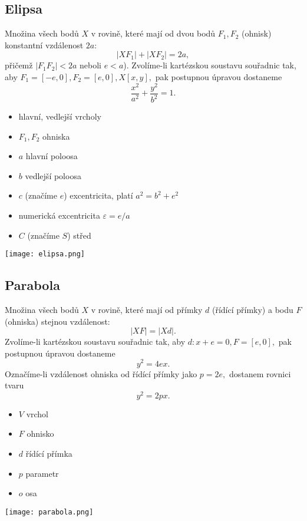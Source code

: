 \subsection{Elipsa}
Množina všech bodů $X$ v rovině, které mají od dvou bodů $F_1, F_2$
(ohnisk) konstantní vzdálenost $2a$:
$$|XF_1| + |XF_2|=2a,$$
přičemž $|F_1F_2|<2a$ neboli $e<a$).
Zvolíme-li kartézskou soustavu souřadnic tak, aby $F_1 = [-e,0], F_2=[e,0],
X[x,y],$ pak postupnou úpravou dostaneme
$$\frac{x^2}{a^2}+\frac{y^2}{b^2}=1.$$

\begin{minipage}{0.48\linewidth}
\begin{itemize}
\item hlavní, vedlejší vrcholy
\item $F_1, F_2$ ohniska
\item $a$ hlavní poloosa
\item $b$ vedlejší poloosa
\item $c$ (značíme $e$) excentricita, platí $a^2=b^2+e^2$
\item numerická excentricita $\varepsilon = e/a$
\item $C$ (značíme $S$) střed
\end{itemize}
\end{minipage}
\hfill
\begin{minipage}{0.48\linewidth}
    \texttt{[image: elipsa.png]}
\end{minipage}


\subsection{Parabola}
Množina všech bodů $X$ v rovině, které mají od přímky $d$ (řídící přímky) a bodu $F$
(ohniska) stejnou vzdálenost:
$$|XF|=|Xd|.$$
Zvolíme-li kartézskou soustavu souřadnic tak, aby $d:x+e=0, F=[e,0],$ pak postupnou
úpravou dostaneme
$$y^2=4ex.$$
Označíme-li vzdálenost ohniska od řídící přímky jako $p=2e,$ dostanem rovnici tvaru
$$y^2=2px.$$

\begin{minipage}{0.48\linewidth}
\begin{itemize}
\item $V$ vrchol
\item $F$ ohnisko
\item $d$ řídící přímka
\item $p$ parametr
\item $o$ osa
\end{itemize}
\end{minipage}
\hfill
\begin{minipage}{0.40\linewidth}
    \texttt{[image: parabola.png]}
\end{minipage}


